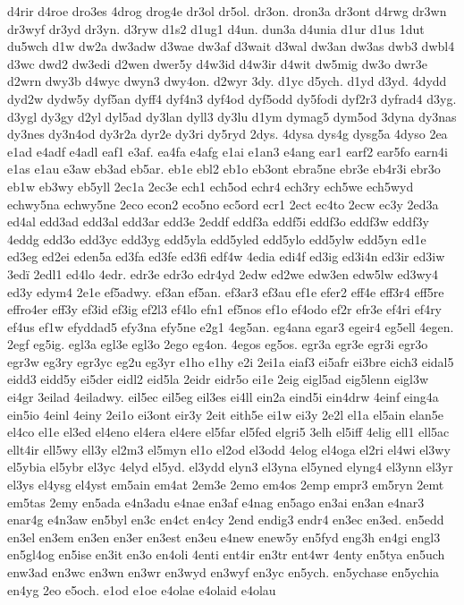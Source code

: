 {d4rir
d4roe
dro3es
4drog
drog4e
dr3ol
dr5ol.
dr3on.
dron3a
dr3ont
d4rwg
dr3wn
dr3wyf
dr3yd
dr3yn.
d3ryw
d1s2
d1ug1
d4un.
dun3a
d4unia
d1ur
d1us
1dut
du5wch
d1w
dw2a
dw3adw
d3wae
dw3af
d3wait
d3wal
dw3an
dw3as
dwb3
dwbl4
d3wc
dwd2
dw3edi
d2wen
dwer5y
d4w3id
d4w3ir
d4wit
dw5mig
dw3o
dwr3e
d2wrn
dwy3b
d4wyc
dwyn3
dwy4on.
d2wyr
3dy.
d1yc
d5ych.
d1yd
d3yd.
4dydd
dyd2w
dydw5y
dyf5an
dyff4
dyf4n3
dyf4od
dyf5odd
dy5fodi
dyf2r3
dyfrad4
d3yg.
d3ygl
dy3gy
d2yl
dyl5ad
dy3lan
dyll3
dy3lu
d1ym
dymag5
dym5od
3dyna
dy3nas
dy3nes
dy3n4od
dy3r2a
dyr2e
dy3ri
dy5ryd
2dys.
4dysa
dys4g
dysg5a
4dyso
2ea
e1ad
e4adf
e4adl
eaf1
e3af.
ea4fa
e4afg
e1ai
e1an3
e4ang
ear1
earf2
ear5fo
earn4i
e1as
e1au
e3aw
eb3ad
eb5ar.
eb1e
ebl2
eb1o
eb3ont
ebra5ne
ebr3e
eb4r3i
ebr3o
eb1w
eb3wy
eb5yll
2ec1a
2ec3e
ech1
ech5od
echr4
ech3ry
ech5we
ech5wyd
echwy5na
echwy5ne
2eco
econ2
eco5no
ec5ord
ecr1
2ect
ec4to
2ecw
ec3y
2ed3a
ed4al
edd3ad
edd3al
edd3ar
edd3e
2eddf
eddf3a
eddf5i
eddf3o
eddf3w
eddf3y
4eddg
edd3o
edd3yc
edd3yg
edd5yla
edd5yled
edd5ylo
edd5ylw
edd5yn
ed1e
ed3eg
ed2ei
eden5a
ed3fa
ed3fe
ed3fi
edf4w
4edia
edi4f
ed3ig
ed3i4n
ed3ir
ed3iw
3ed^^ef
2edl1
ed4lo
4edr.
edr3e
edr3o
edr4yd
2edw
ed2we
edw3en
edw5lw
ed3wy4
ed3y
edym4
2e1e
ef5adwy.
ef3an
ef5an.
ef3ar3
ef3au
ef1e
efer2
eff4e
eff3r4
eff5re
effro4er
eff3y
ef3id
ef3ig
ef2l3
ef4lo
efn1
ef5nos
ef1o
ef4odo
ef2r
efr3e
ef4ri
ef4ry
ef4us
ef1w
efyddad5
efy3na
efy5ne
e2g1
4eg5an.
eg4ana
egar3
egeir4
eg5ell
4egen.
2egf
eg5ig.
egl3a
egl3e
egl3o
2ego
eg4on.
4egos
eg5os.
egr3a
egr3e
egr3i
egr3o
egr3w
eg3ry
egr3yc
eg2u
eg3yr
e1ho
e1hy
e2i
2ei1a
eiaf3
ei5afr
ei3bre
eich3
eidal5
eidd3
eidd5y
ei5der
eidl2
eid5la
2eidr
eidr5o
ei1e
2eig
eigl5ad
eig5lenn
eigl3w
ei4gr
3eilad
4eiladwy.
eil5ec
eil5eg
eil3es
ei4ll
ein2a
eind5i
ein4drw
4einf
eing4a
ein5io
4einl
4einy
2ei1o
ei3ont
eir3y
2eit
eith5e
ei1w
ei3y
2e2l
el1a
el5ain
elan5e
el4co
el1e
el3ed
el4eno
el4era
el4ere
el5far
el5fed
elgri5
3elh
el5iff
4elig
ell1
ell5ac
ellt4ir
ell5wy
ell3y
el2m3
el5myn
el1o
el2od
el3odd
4elog
el4oga
el2ri
el4wi
el3wy
el5ybia
el5ybr
el3yc
4elyd
el5yd.
el3ydd
elyn3
el3yna
el5yned
elyng4
el3ynn
el3yr
el3ys
el4ysg
el4yst
em5ain
em4at
2em3e
2emo
em4os
2emp
empr3
em5ryn
2emt
em5tas
2emy
en5ada
e4n3adu
e4nae
en3af
e4nag
en5ago
en3ai
en3an
e4nar3
enar4g
e4n3aw
en5byl
en3c
en4ct
en4cy
2end
endig3
endr4
en3ec
en3ed.
en5edd
en3el
en3em
en3en
en3er
en3est
en3eu
e4new
enew5y
en5fyd
eng3h
en4gi
engl3
en5gl4og
en5ise
en3it
en3o
en4oli
4enti
ent4ir
en3tr
ent4wr
4enty
en5tya
en5uch
enw3ad
en3wc
en3wn
en3wr
en3wyd
en3wyf
en3yc
en5ych.
en5ychase
en5ychia
en4yg
2eo
e5och.
e1od
e1oe
e4olae
e4olaid
e4olau
}
